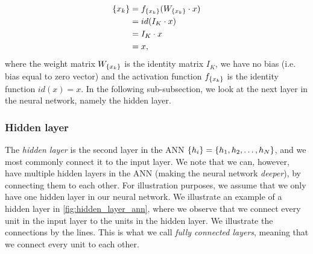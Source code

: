 \begin{align}
    \label{eqn:input_layer_ann}
    \left\{ {x}_{k} \right\}
    &= f_{\left\{ {x}_{k} \right\}}(W_{\left\{ {x}_{k} \right\}} \cdot x) \\
    &= id(I_K \cdot x) \notag \\ 
    &= I_K \cdot x \notag \\
    &= x, \notag
\end{align}
where the weight matrix $W_{\left\{ {x}_{k} \right\}}$ is the identity matrix $I_K$, we have no bias (i.e. bias equal to zero vector) and the activation function $f_{\left\{ {x}_{k} \right\}}$ is the identity function $id(x)=x$. In the following sub-subsection, we look at the next layer in the neural network, namely the hidden layer.

\subsubsection{Hidden layer}
\label{sec:ann-hidden-layer}
The \textit{hidden layer} is the second layer in the ANN $\left\{ {h}_{i} \right\} = \left\{ h_1, h_2, \ldots, h_N \right\}$, and we most commonly connect it to the input layer. We note that we can, however, have multiple hidden layers in the ANN (making the neural network \textit{deeper}), by connecting them to each other. For illustration purposes, we assume that we only have one hidden layer in our neural network. We illustrate an example of a hidden layer in \cref{fig:hidden_layer_ann}, where we observe that we connect every unit in the input layer to the units in the hidden layer. We illustrate the connections by the lines. This is what we call \textit{fully connected layers}, meaning that we connect every unit to each other.

